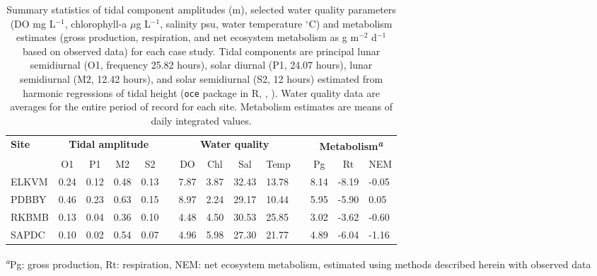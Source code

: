 \documentclass[letterpaper,12pt,oneside]{article}\usepackage[]{graphicx}\usepackage[]{color}
\begin{document}
\begin{table}[!tbp]
\caption{Summary statistics of tidal component amplitudes (m), selected water quality parameters (\ac{DO} mg L$^{-1}$, chlorophyll-a $\mu$g L$^{-1}$, salinity psu, water temperature $^{\circ}$C)  and metabolism estimates (gross production, respiration, and net ecosystem metabolism as g m$^{-2}$ d$^{-1}$ based on observed data) for each case study.  Tidal components are principal lunar semidiurnal (O1, frequency 25.82 hours), solar diurnal (P1, 24.07 hours), lunar semidiurnal (M2, 12.42 hours), and solar semidiurnal (S2, 12 hours) estimated from harmonic regressions of tidal height (\texttt{oce} package in R, \citealt{Foreman89}, ).  Water quality data are averages for the entire period of record for each site.  Metabolism estimates are means of daily integrated values.\label{tab:case_att}} 
\begin{center}
\begin{tabular}{lllllcllllclll}
\hline\hline
\multicolumn{1}{l}{\bfseries Site}&\multicolumn{4}{c}{\bfseries Tidal amplitude}&\multicolumn{1}{c}{\bfseries }&\multicolumn{4}{c}{\bfseries Water quality}&\multicolumn{1}{c}{\bfseries }&\multicolumn{3}{c}{\bfseries Metabolism\textsuperscript{\textit{a}}}\tabularnewline
\cline{2-5} \cline{7-10} \cline{12-14}
\multicolumn{1}{l}{}&\multicolumn{1}{c}{O1}&\multicolumn{1}{c}{P1}&\multicolumn{1}{c}{M2}&\multicolumn{1}{c}{S2}&\multicolumn{1}{c}{}&\multicolumn{1}{c}{DO}&\multicolumn{1}{c}{Chl}&\multicolumn{1}{c}{Sal}&\multicolumn{1}{c}{Temp}&\multicolumn{1}{c}{}&\multicolumn{1}{c}{Pg}&\multicolumn{1}{c}{Rt}&\multicolumn{1}{c}{NEM}\tabularnewline
\hline
ELKVM&0.24&0.12&0.48&0.13&&7.87&3.87&32.43&13.78&&8.14&-8.19&-0.05\tabularnewline
PDBBY&0.46&0.23&0.63&0.15&&8.97&2.24&29.17&10.44&&5.95&-5.90& 0.05\tabularnewline
RKBMB&0.13&0.04&0.36&0.10&&4.48&4.50&30.53&25.85&&3.02&-3.62&-0.60\tabularnewline
SAPDC&0.10&0.02&0.54&0.07&&4.96&5.98&27.30&21.77&&4.89&-6.04&-1.16\tabularnewline
\hline
\end{tabular}\end{center}

\footnotesize\textsuperscript{\textit{a}}Pg: gross production, Rt: respiration, NEM: net ecosystem metabolism, estimated using methods described herein with observed data\end{table}
\end{document}
